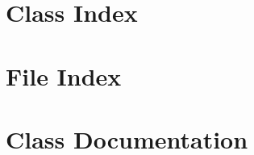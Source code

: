 \let\mypdfximage\pdfximage\def\pdfximage{\immediate\mypdfximage}\documentclass[twoside]{book}
\newcommand{\+}{\discretionary{\mbox{\scriptsize$\hookleftarrow$}}{}{}}
\begin{document}
\chapter{Class Index}

\chapter{File Index}

\chapter{Class Documentation}

































\end{document}
